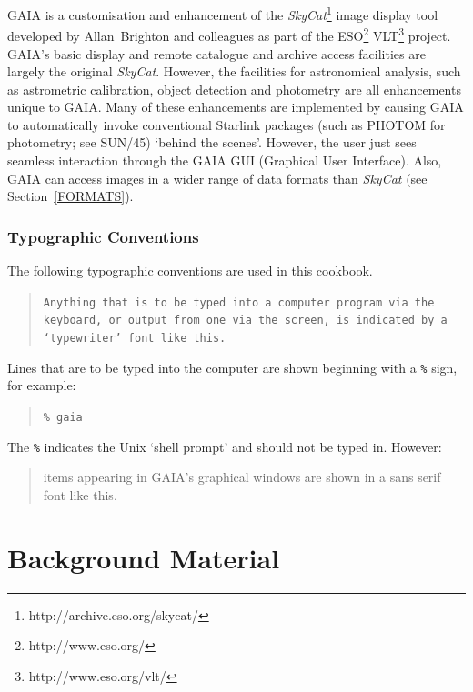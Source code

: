 \documentclass[twoside,11pt]{article}
\newcommand{\stardocinitials}  {SC}
\newcommand{\stardocnumber}    {17.1}
\newcommand{\stardocname}{\stardocinitials /\stardocnumber}
\newcommand{\htmladdnormallinkfoot}[2]{#1\footnote{#2}}
\newcommand{\xref}[3]{#1}
\newcommand{\xlabel}[1]{}
\begin{document}
GAIA is a customisation and enhancement of the
\htmladdnormallinkfoot{{\it SkyCat}\/}{http://archive.eso.org/skycat/}
image display tool developed by Allan~Brighton and colleagues as part
of the \htmladdnormallinkfoot{ESO}{http://www.eso.org/}
\htmladdnormallinkfoot{VLT}{http://www.eso.org/vlt/} project.  GAIA's basic
display and remote catalogue and archive access facilities are largely the
original {\it SkyCat}.  However, the facilities for astronomical analysis,
such as astrometric calibration, object detection and photometry are
all enhancements unique to GAIA.  Many of these enhancements are
implemented by causing GAIA to automatically invoke conventional Starlink
packages (such as PHOTOM for photometry; see
\xref{SUN/45}{sun45}{}\/\cite{SUN45}) `behind the scenes'.  However,
the user just sees seamless interaction through the GAIA GUI (Graphical
User Interface).  Also, GAIA can access images in a wider range of
data formats than {\it SkyCat}\/ (see Section~\ref{FORMATS}).

\section{\xlabel{TYPO}\label{TYPO}Typographic Conventions}

The following typographic conventions are used in this cookbook.

\begin{quote}
{\tt Anything that is to be typed into a computer program via the keyboard,
or output from one via the screen, is indicated by a `typewriter' font
like this.}
\end{quote}

Lines that are to be typed into the computer are shown beginning with a
{\tt{\%}} sign, for example:

\begin{quote}
{\tt \% gaia}
\end{quote}

The {\tt{\%}} indicates the Unix `shell prompt' and should not be
typed in.  However:

\begin{quote}
{\sf items appearing in GAIA's graphical windows are shown in a sans
serif font like this.}
\end{quote}


\cleardoublepage
\markboth{\stardocname}{\stardocname}
\part{Background Material}
\markboth{\stardocname}{\stardocname}
\end{document}
